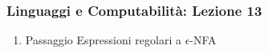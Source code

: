




\begin{frame}[fragile]
	\frametitle{Linguaggi e Computabilità: Lezione 13}
\begin{enumerate}
\item
Passaggio Espressioni regolari a $\epsilon$-NFA
\end{enumerate}
\end{frame}



